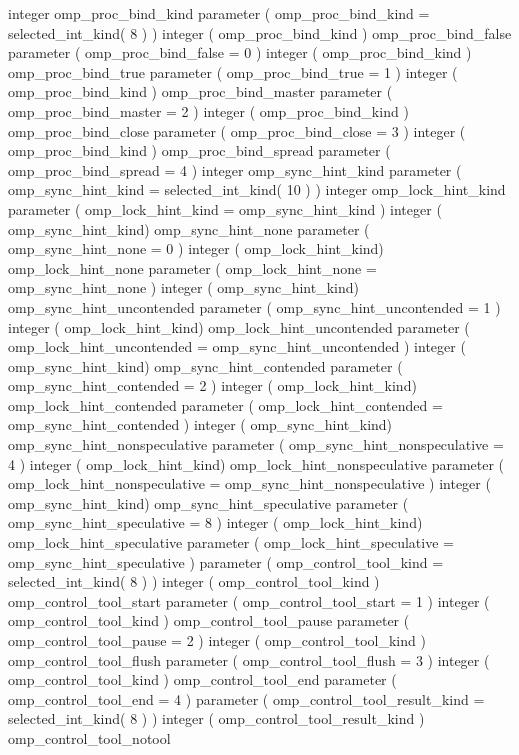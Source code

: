 {\begin{ompfSyntax}
     integer omp_proc_bind_kind
     parameter ( omp_proc_bind_kind = selected_int_kind( 8 ) )
     integer ( omp_proc_bind_kind ) omp_proc_bind_false
     parameter ( omp_proc_bind_false = 0 )
     integer ( omp_proc_bind_kind ) omp_proc_bind_true
     parameter ( omp_proc_bind_true = 1 )
     integer ( omp_proc_bind_kind ) omp_proc_bind_master
     parameter ( omp_proc_bind_master = 2 )
     integer ( omp_proc_bind_kind ) omp_proc_bind_close
     parameter ( omp_proc_bind_close = 3 )
     integer ( omp_proc_bind_kind ) omp_proc_bind_spread
     parameter ( omp_proc_bind_spread = 4 )
     integer omp_sync_hint_kind
     parameter ( omp_sync_hint_kind = selected_int_kind( 10 ) )
     integer omp_lock_hint_kind
     parameter ( omp_lock_hint_kind = omp_sync_hint_kind )
     integer ( omp_sync_hint_kind) omp_sync_hint_none
     parameter ( omp_sync_hint_none = 0 )
     integer ( omp_lock_hint_kind) omp_lock_hint_none
     parameter ( omp_lock_hint_none = omp_sync_hint_none )
     integer ( omp_sync_hint_kind) omp_sync_hint_uncontended
     parameter ( omp_sync_hint_uncontended = 1 )
     integer ( omp_lock_hint_kind) omp_lock_hint_uncontended
     parameter ( omp_lock_hint_uncontended = omp_sync_hint_uncontended )
     integer ( omp_sync_hint_kind) omp_sync_hint_contended
     parameter ( omp_sync_hint_contended = 2 )
     integer ( omp_lock_hint_kind) omp_lock_hint_contended
     parameter ( omp_lock_hint_contended = omp_sync_hint_contended )
     integer ( omp_sync_hint_kind) omp_sync_hint_nonspeculative
     parameter ( omp_sync_hint_nonspeculative = 4 )
     integer ( omp_lock_hint_kind) omp_lock_hint_nonspeculative
     parameter ( omp_lock_hint_nonspeculative = omp_sync_hint_nonspeculative )
     integer ( omp_sync_hint_kind) omp_sync_hint_speculative
     parameter ( omp_sync_hint_speculative = 8 )
     integer ( omp_lock_hint_kind) omp_lock_hint_speculative
     parameter ( omp_lock_hint_speculative = omp_sync_hint_speculative )
     parameter ( omp_control_tool_kind = selected_int_kind( 8 ) )
     integer ( omp_control_tool_kind ) omp_control_tool_start
     parameter ( omp_control_tool_start = 1 )
     integer ( omp_control_tool_kind ) omp_control_tool_pause
     parameter ( omp_control_tool_pause = 2 )
     integer ( omp_control_tool_kind ) omp_control_tool_flush
     parameter ( omp_control_tool_flush = 3 )
     integer ( omp_control_tool_kind ) omp_control_tool_end
     parameter ( omp_control_tool_end = 4 )
     parameter ( omp_control_tool_result_kind = selected_int_kind( 8 ) )
     integer ( omp_control_tool_result_kind ) omp_control_tool_notool

\end{ompfSyntax}}

